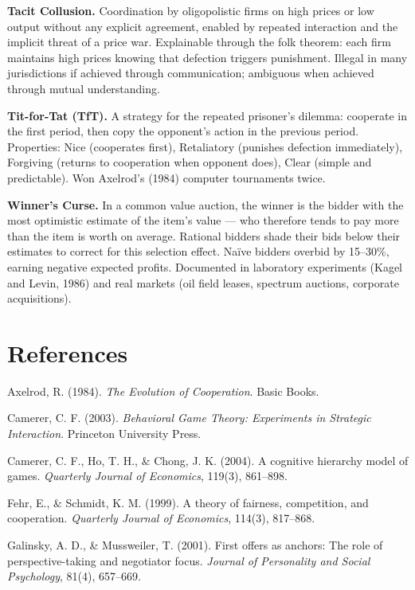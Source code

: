 \documentclass[12pt, letterpaper]{article}
\begin{document}
\textbf{Tacit Collusion.} Coordination by oligopolistic firms on high prices or low output without any explicit agreement, enabled by repeated interaction and the implicit threat of a price war. Explainable through the folk theorem: each firm maintains high prices knowing that defection triggers punishment. Illegal in many jurisdictions if achieved through communication; ambiguous when achieved through mutual understanding.

\textbf{Tit-for-Tat (TfT).} A strategy for the repeated prisoner's dilemma: cooperate in the first period, then copy the opponent's action in the previous period. Properties: Nice (cooperates first), Retaliatory (punishes defection immediately), Forgiving (returns to cooperation when opponent does), Clear (simple and predictable). Won Axelrod's (1984) computer tournaments twice.

\textbf{Winner's Curse.} In a common value auction, the winner is the bidder with the most optimistic estimate of the item's value --- who therefore tends to pay more than the item is worth on average. Rational bidders shade their bids below their estimates to correct for this selection effect. Naïve bidders overbid by 15--30\%, earning negative expected profits. Documented in laboratory experiments (Kagel and Levin, 1986) and real markets (oil field leases, spectrum auctions, corporate acquisitions).

\medskip


\section*{References}


Axelrod, R. (1984). \textit{The Evolution of Cooperation}. Basic Books.

Camerer, C. F. (2003). \textit{Behavioral Game Theory: Experiments in Strategic Interaction}. Princeton University Press.

Camerer, C. F., Ho, T. H., \& Chong, J. K. (2004). A cognitive hierarchy model of games. \textit{Quarterly Journal of Economics}, 119(3), 861--898.

Fehr, E., \& Schmidt, K. M. (1999). A theory of fairness, competition, and cooperation. \textit{Quarterly Journal of Economics}, 114(3), 817--868.

Galinsky, A. D., \& Mussweiler, T. (2001). First offers as anchors: The role of perspective-taking and negotiator focus. \textit{Journal of Personality and Social Psychology}, 81(4), 657--669.
\end{document}
